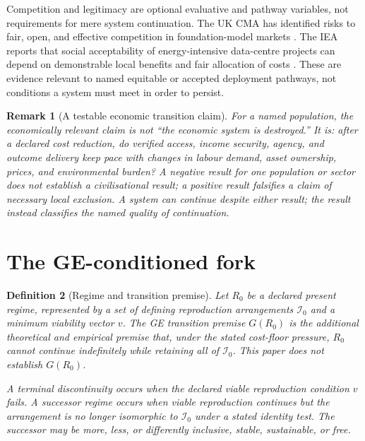 \documentclass[11pt]{article}
\newtheorem{definition}{Definition}
\newtheorem{remark}[definition]{Remark}
\begin{document}
Competition and legitimacy are optional evaluative and pathway variables, not
requirements for mere system continuation. The UK CMA has identified risks to
fair, open, and effective competition in foundation-model markets \citep{cma2024}.
The IEA reports that social acceptability of energy-intensive data-centre
projects can depend on demonstrable local benefits and fair allocation of costs
\citep{iea2026}. These are evidence relevant to named equitable or accepted
deployment pathways, not conditions a system must meet in order to persist.

\begin{remark}[A testable economic transition claim]
For a named population, the economically relevant claim is not ``the economic
system is destroyed.'' It is: after a declared cost reduction, do verified
access, income security, agency, and outcome delivery keep pace with changes in
labour demand, asset ownership, prices, and environmental burden? A negative
result for one population or sector does not establish a civilisational result;
a positive result falsifies a claim of necessary local exclusion. A system can
continue despite either result; the result instead classifies the named quality
of continuation.
\end{remark}

\section{The GE-conditioned fork}\label{sec:fork}

\begin{definition}[Regime and transition premise]
Let $R_0$ be a declared present regime, represented by a set of defining
reproduction arrangements $\mathcal{I}_0$ and a minimum viability vector $v$.
The \emph{GE transition premise} $G(R_0)$ is the additional theoretical and
empirical premise that, under the stated cost-floor pressure, $R_0$ cannot
continue indefinitely while retaining all of $\mathcal{I}_0$. This paper does
not establish $G(R_0)$.

A \emph{terminal discontinuity} occurs when the declared viable reproduction
condition $v$ fails. A \emph{successor regime} occurs when viable reproduction
continues but the arrangement is no longer isomorphic to $\mathcal{I}_0$ under
a stated identity test. The successor may be more, less, or differently
inclusive, stable, sustainable, or free.
\end{definition}
\end{document}

